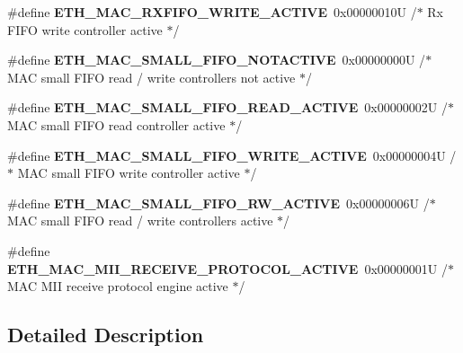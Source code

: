 \begin{DoxyCompactItemize}
\mbox{\label{group___h_a_l___e_t_h___aliased___defines_gaed7a7d977c0411b7303270d6c35e19d2}} 
\#define {\bfseries E\+T\+H\+\_\+\+M\+A\+C\+\_\+\+R\+X\+F\+I\+F\+O\+\_\+\+W\+R\+I\+T\+E\+\_\+\+A\+C\+T\+I\+VE}~0x00000010\+U  /$\ast$ Rx F\+I\+F\+O write controller active $\ast$/
\item 
\mbox{\label{group___h_a_l___e_t_h___aliased___defines_gac16927a1916a399766258aa819372c68}} 
\#define {\bfseries E\+T\+H\+\_\+\+M\+A\+C\+\_\+\+S\+M\+A\+L\+L\+\_\+\+F\+I\+F\+O\+\_\+\+N\+O\+T\+A\+C\+T\+I\+VE}~0x00000000\+U  /$\ast$ M\+A\+C small F\+I\+F\+O read / write controllers not active $\ast$/
\item 
\mbox{\label{group___h_a_l___e_t_h___aliased___defines_gaaeb391df53728b1ee3d7dc0f26c89f05}} 
\#define {\bfseries E\+T\+H\+\_\+\+M\+A\+C\+\_\+\+S\+M\+A\+L\+L\+\_\+\+F\+I\+F\+O\+\_\+\+R\+E\+A\+D\+\_\+\+A\+C\+T\+I\+VE}~0x00000002\+U  /$\ast$ M\+A\+C small F\+I\+F\+O read controller active $\ast$/
\item 
\mbox{\label{group___h_a_l___e_t_h___aliased___defines_ga54622c82079395c06def322572f42d90}} 
\#define {\bfseries E\+T\+H\+\_\+\+M\+A\+C\+\_\+\+S\+M\+A\+L\+L\+\_\+\+F\+I\+F\+O\+\_\+\+W\+R\+I\+T\+E\+\_\+\+A\+C\+T\+I\+VE}~0x00000004\+U  /$\ast$ M\+A\+C small F\+I\+F\+O write controller active $\ast$/
\item 
\mbox{\label{group___h_a_l___e_t_h___aliased___defines_gaef20d59c181d5c3c828ea428e7c0d81e}} 
\#define {\bfseries E\+T\+H\+\_\+\+M\+A\+C\+\_\+\+S\+M\+A\+L\+L\+\_\+\+F\+I\+F\+O\+\_\+\+R\+W\+\_\+\+A\+C\+T\+I\+VE}~0x00000006\+U  /$\ast$ M\+A\+C small F\+I\+F\+O read / write controllers active $\ast$/
\item 
\mbox{\label{group___h_a_l___e_t_h___aliased___defines_ga69bdbf3c1abe74dde1f5e1d2a85a501e}} 
\#define {\bfseries E\+T\+H\+\_\+\+M\+A\+C\+\_\+\+M\+I\+I\+\_\+\+R\+E\+C\+E\+I\+V\+E\+\_\+\+P\+R\+O\+T\+O\+C\+O\+L\+\_\+\+A\+C\+T\+I\+VE}~0x00000001\+U  /$\ast$ M\+A\+C M\+I\+I receive protocol engine active $\ast$/
\end{DoxyCompactItemize}


\subsection{Detailed Description}
